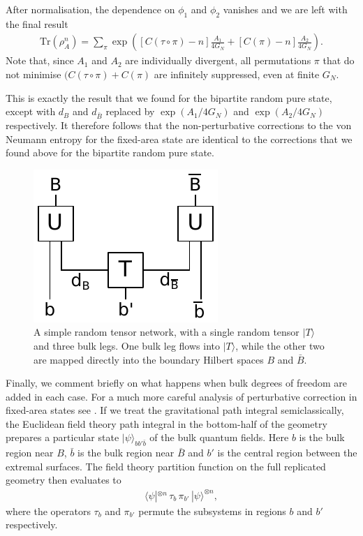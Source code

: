 \documentclass[12pt]{article}
\numberwithin{equation}{section}
\def\tr{\text{Tr}}
\begin{document}
After normalisation, the dependence on $\phi_1$ and $\phi_2$ vanishes and we are left with the final result
\begin{align}
\tr(\rho_A^n) = \sum_\pi \exp\left(\left[C(\tau \circ \pi) - n\right] \frac{A_1}{4 G_N} + \left[C(\pi) - n\right] \frac{A_2}{4 G_N}\right).
\end{align}
Note that, since $A_1$ and $A_2$ are individually divergent, all permutations $\pi$ that do not minimise $(C(\tau \circ \pi) + C(\pi)$ are infinitely suppressed, even at finite $G_N$.

This is exactly the result that we found for the bipartite random pure state, except with $d_B$ and $d_{\bar B}$ replaced by $\exp(A_1/4G_N)$ and $\exp(A_2/4G_N)$ respectively. It therefore follows that the non-perturbative corrections to the von Neumann entropy for the fixed-area state are identical to the corrections that we found above for the bipartite random pure state.
\begin{figure}[t]
\begin{center}
\includegraphics[width = .3\textwidth]{images/QC.pdf}
\caption{{\small A simple random tensor network, with a single random tensor $|T\rangle$ and three bulk legs. One bulk leg flows into $| T\rangle$, while the other two are mapped directly into the boundary Hilbert spaces $B$ and $\bar B$.}}\label{fig:bulklegsTN}
\end{center}
\end{figure}

Finally, we comment briefly on what happens when bulk degrees of freedom are added in each case. For a much more careful analysis of perturbative correction in fixed-area states see \cite{Dong:2019piw}. If we treat the gravitational path integral semiclassically, the Euclidean field theory path integral in the bottom-half of the geometry prepares a particular state $|\psi\rangle_{b b' \bar{b}}$ of the bulk quantum fields. Here $b$ is the bulk region near $B$, $\bar b$ is the bulk region near $\bar B$ and $b'$ is the central region between the extremal surfaces. The field theory partition function on the full replicated geometry then evaluates to
\begin{align} \label{eq:bulklegs}
\langle\psi|^{\otimes n}\, \tau_b\, \pi_{b'}\, |\psi\rangle^{\otimes n},
\end{align}
where the operators $\tau_b$ and $\pi_{b'}$ permute the subsystems in regions $b$ and $b'$ respectively.
\end{document}
